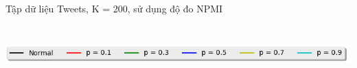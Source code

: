 \documentclass[pdf]{beamer}
\begin{document}
\begin{frame}{Tập dữ liệu Tweets, K = 200, sử dụng độ đo NPMI }
\begin{columns}[T]
\begin{column}{.50\textwidth}
\begin{figure}
\end{figure}				
\end{column} %
\end{columns}
\begin{center}
\includegraphics[width=1\textwidth]{menu.png}	
\end{center}
\end{frame}
\end{document}
